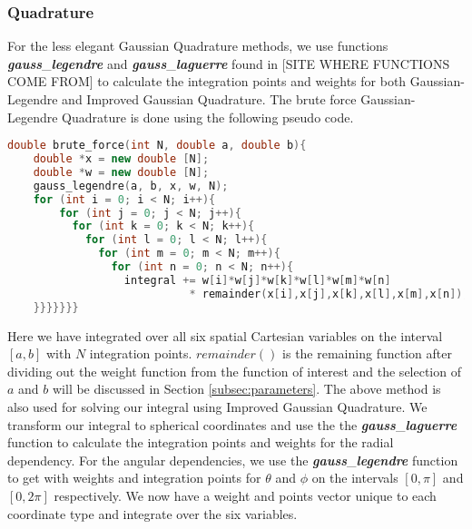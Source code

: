 \documentclass{emulateapj}
\begin{document}
\subsubsection{Quadrature}
For the less elegant Gaussian Quadrature methods, we use functions \textbf{\textit{gauss}}\_\textbf{\textit{legendre}} and \textbf{\textit{gauss}}\_\textbf{\textit{laguerre}} found in [SITE WHERE FUNCTIONS COME FROM] to calculate the integration points and weights for both Gaussian-Legendre and Improved Gaussian Quadrature. The brute force Gaussian-Legendre Quadrature is done using the following pseudo code.
\begin{lstlisting}[language=c++]
double brute_force(int N, double a, double b){
    double *x = new double [N];
    double *w = new double [N];
    gauss_legendre(a, b, x, w, N);
    for (int i = 0; i < N; i++){
        for (int j = 0; j < N; j++){
          for (int k = 0; k < N; k++){
            for (int l = 0; l < N; l++){
              for (int m = 0; m < N; m++){
                for (int n = 0; n < N; n++){
                  integral += w[i]*w[j]*w[k]*w[l]*w[m]*w[n]
                            * remainder(x[i],x[j],x[k],x[l],x[m],x[n]);
    }}}}}}}
\end{lstlisting}
Here we have integrated over all six spatial Cartesian variables on the interval $[a,b]$ with $N$ integration points. $remainder()$ is the remaining function after dividing out the weight function from the function of interest and the selection of $a$ and $b$ will be discussed in Section \ref{subsec:parameters}. The above method is also used for solving our integral using Improved Gaussian Quadrature. We transform our integral to spherical coordinates and use the  the \textbf{\textit{gauss}}\_\textbf{\textit{laguerre}} function to calculate the integration points and weights for the radial dependency. For the angular dependencies, we use the \textbf{\textit{gauss}}\_\textbf{\textit{legendre}} function to get with weights and integration points for $\theta$ and $\phi$ on the intervals $[0,\pi]$ and $[0,2\pi]$ respectively. We now have a weight and points vector unique to each coordinate type and integrate over the six variables.
\end{document}
